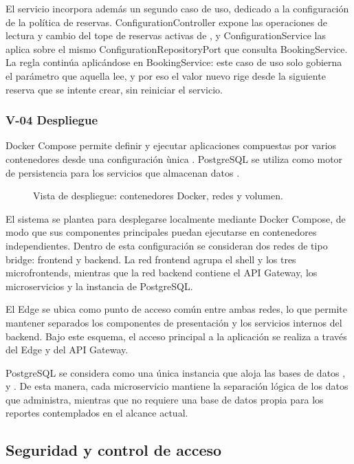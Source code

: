 El servicio incorpora además un segundo caso de uso, dedicado a la configuración
de la política de reservas. ConfigurationController expone las operaciones de
lectura y cambio del tope de reservas activas de , y
ConfigurationService las aplica sobre el mismo ConfigurationRepositoryPort que
consulta BookingService. La regla continúa aplicándose en BookingService: este
caso de uso solo gobierna el parámetro que aquella lee, y por eso el valor nuevo
rige desde la siguiente reserva que se intente crear, sin reiniciar el servicio.

\subsubsection{\texorpdfstring{\textsf{V-04}}{V-04} Despliegue}
\label{v:04}

Docker Compose permite definir y ejecutar aplicaciones compuestas por varios
contenedores desde una configuraci\'on \`unica \cite{docker-compose}. PostgreSQL
se utiliza como motor de persistencia para los servicios que almacenan datos
\cite{postgresql-docs}.

\begin{figure}[H]
  \centering
  \caption{Vista de despliegue: contenedores Docker, redes y volumen.}
  \label{fig:despliegue}
\end{figure}

El sistema se plantea para desplegarse localmente mediante Docker Compose, de modo
que sus componentes principales puedan ejecutarse en contenedores independientes.
Dentro de esta configuración se consideran dos redes de tipo bridge: frontend y
backend. La red frontend agrupa el shell y los tres microfrontends, mientras que
la red backend contiene el API Gateway, los microservicios y la instancia de
PostgreSQL.

El Edge se ubica como punto de acceso común entre ambas redes, lo que permite
mantener separados los componentes de presentación y los servicios internos del
backend. Bajo este esquema, el acceso principal a la aplicación se realiza a través
del Edge y del API Gateway.

PostgreSQL se considera como una única instancia que aloja las bases de datos
,  y . De esta manera, cada
microservicio mantiene la separación lógica de los datos que administra, mientras
que  no requiere una base de datos propia para los reportes
contemplados en el alcance actual.

\subsection{Seguridad y control de acceso}
\label{sec:seguridad}

